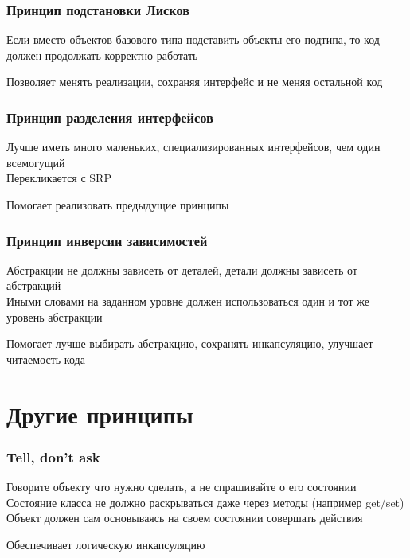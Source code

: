 \documentclass[russian,aspectratio=169,14pt]{beamer}
\begin{document}
\begin{frame}
	\frametitle{Принцип подстановки Лисков}
	\begin{minipage}{1.0\textwidth}
	Если вместо объектов базового типа подставить объекты его подтипа, то код должен продолжать корректно работать\\
	\end{minipage}
	\begin{minipage}{1.0\textwidth}
	Позволяет менять реализации, сохраняя интерфейс и не меняя остальной код
	\end{minipage}
\end{frame}

\begin{frame}
	\frametitle{Принцип разделения интерфейсов}
	\begin{minipage}{1.0\textwidth}
	Лучше иметь много маленьких, специализированных интерфейсов, чем один всемогущий\\
	Перекликается с SRP\\
	\end{minipage}
	\begin{minipage}{1.0\textwidth}
	Помогает реализовать предыдущие принципы
	\end{minipage}
\end{frame}

\begin{frame}
	\frametitle{Принцип инверсии зависимостей}
	\begin{minipage}{1.0\textwidth}
	Абстракции не должны зависеть от деталей, детали должны зависеть от абстракций\\
	Иными словами на заданном уровне должен использоваться один и тот же уровень абстракции\\
	\end{minipage}
	\begin{minipage}{1.0\textwidth}
	Помогает лучше выбирать абстракцию, сохранять инкапсуляцию, улучшает читаемость кода
	\end{minipage}
\end{frame}

\section{Другие принципы}

\begin{frame}
	\frametitle{Tell, don't ask}
	\begin{minipage}{1.0\textwidth}
	Говорите объекту что нужно сделать, а не спрашивайте о его состоянии\\
	Состояние класса не должно раскрываться даже через методы (например get/set)\\
	Объект должен сам основываясь на своем состоянии совершать действия\\
	\end{minipage}
	\begin{minipage}{1.0\textwidth}
	Обеспечивает логическую инкапсуляцию
	\end{minipage}
\end{frame}
\end{document}

